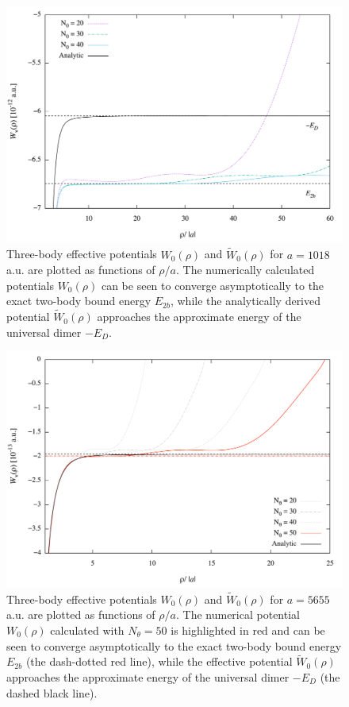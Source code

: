 \begin{figure}[htbp!]
	\includegraphics[width=\linewidth]{twobodyenergy.pdf}
	\caption{Three-body effective potentials $W_0(\rho)$ and $\widetilde{W}_0(\rho)$ for $a=1018$ a.u. are plotted as functions of $\rho/a$. The numerically calculated potentials $W_0(\rho)$ can be seen to converge asymptotically to the exact two-body bound energy $E_{2b}$, while the analytically derived potential $\widetilde{W}_0(\rho)$ approaches the approximate energy of the universal dimer $-E_D$.}
	\label{fig:twobody}
\end{figure} 

\begin{figure}[!ht]
	\includegraphics[width=\linewidth]{twobodyenergy_5.pdf}
	\caption{Three-body effective potentials $W_0(\rho)$ and $\widetilde{W}_0(\rho)$ for $a=5655$ a.u. are plotted as functions of $\rho/a$. The numerical potential $W_0(\rho)$ calculated with $N_{\theta} = 50$ is highlighted in red and can be seen to converge asymptotically to the exact two-body bound energy $E_{2b}$ (the dash-dotted red line), while the effective potential $\widetilde{W}_0(\rho)$ approaches the approximate energy of the universal dimer $-E_D$ (the dashed black line).}
	\label{fig:twobody_5}
\end{figure}

